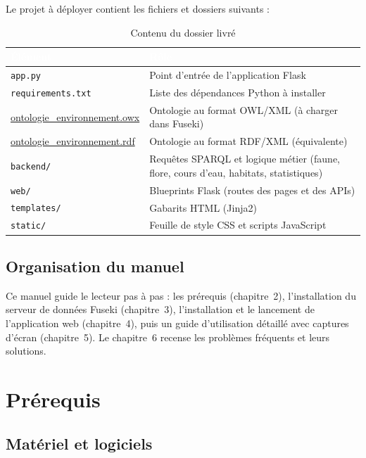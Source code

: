 ﻿\documentclass[12pt,a4paper]{report}
\newcommand{\tete}[1]{\cellcolor{bleu}\textcolor{white}{\bfseries #1}}
\begin{document}
Le projet à déployer contient les fichiers et dossiers suivants :

\begin{table}[H]
\centering
\caption{Contenu du dossier livré}
\begin{tabular}{@{}p{5.8cm}p{9.2cm}@{}}
\hline
\tete{Élément} & \tete{Rôle} \\
\hline
\rowcolor{grisfond} \texttt{app.py} & Point d'entrée de l'application Flask \\
\rowcolor{grisfond} \texttt{requirements.txt} & Liste des dépendances Python à installer \\
\rowcolor{grisfond} \url{ontologie_environnement.owx} & Ontologie au format OWL/XML (à charger dans Fuseki) \\
\rowcolor{grisfond} \url{ontologie_environnement.rdf} & Ontologie au format RDF/XML (équivalente) \\
\rowcolor{grisfond} \texttt{backend/} & Requêtes SPARQL et logique métier (faune, flore, cours d'eau, habitats, statistiques) \\
\rowcolor{grisfond} \texttt{web/} & Blueprints Flask (routes des pages et des APIs) \\
\rowcolor{grisfond} \texttt{templates/} & Gabarits HTML (Jinja2) \\
\rowcolor{grisfond} \texttt{static/} & Feuille de style CSS et scripts JavaScript \\
\hline
\end{tabular}
\end{table}

\section{Organisation du manuel}

Ce manuel guide le lecteur pas à pas : les prérequis (chapitre~2), l'installation du serveur de données
Fuseki (chapitre~3), l'installation et le lancement de l'application web (chapitre~4), puis un guide
d'utilisation détaillé avec captures d'écran (chapitre~5). Le chapitre~6 recense les problèmes
fréquents et leurs solutions.

\chapter{Prérequis}

\section{Matériel et logiciels}
\end{document}
